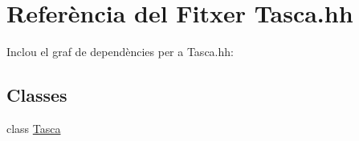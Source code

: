 \hypertarget{_tasca_8hh}{\section{Referència del Fitxer Tasca.\-hh}
\label{_tasca_8hh}
}
Inclou el graf de dependències per a Tasca.\-hh\-:
\subsection*{Classes}
\begin{DoxyCompactItemize}
\item 
class \hyperlink{class_tasca}{Tasca}
\end{DoxyCompactItemize}
